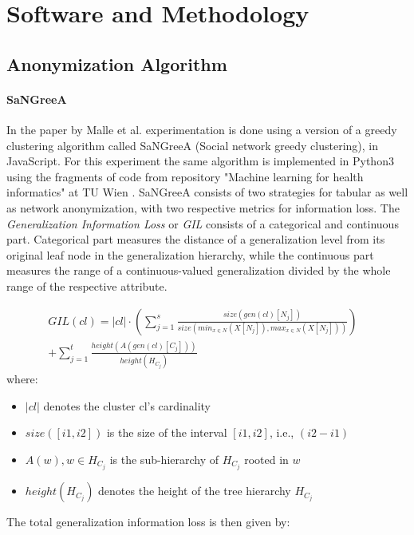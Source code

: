 \documentclass{article}
\begin{document}
\section{Software and Methodology}

\subsection{Anonymization Algorithm}
\paragraph{SaNGreeA}
In the paper by Malle et al. \cite{malle2017not} experimentation is done using a version of a greedy clustering algorithm called SaNGreeA (Social network greedy clustering), \cite{campan2009data} in JavaScript. For this experiment the same algorithm is implemented in Python3 \cite{sarcevic2018sangreea} using the fragments of code from repository "Machine learning for health informatics" at TU Wien \cite{malle2016sangreea}. 
SaNGreeA consists of two strategies for tabular as well as network anonymization, with two respective metrics for information loss. The \textit{Generalization Information Loss} or \textit{GIL} consists of a categorical and continuous part. Categorical part measures the distance of a generalization level from its original leaf node in the generalization hierarchy, while the continuous part measures the range of a continuous-valued generalization divided by the whole range of the respective attribute. 

\begin{align*}
	GIL(cl) = |cl| \cdot (\sum_{j=1}^{s}\frac{size(gen(cl)[N_j])}{size(min_{x\in N}(X[N_j]),max_{x\in N}(X[N_j]))})& \\ 
					+ \sum_{j=1}^{t}\frac{height(A(gen(cl)[C_j]))}{height(H_{C_j})}&
\end{align*}
where:

\begin{itemize}
	\item $|cl|$ denotes the cluster cl's cardinality
	\item $size([i1,i2])$ is the size of the interval $[i1,i2]$, i.e., $(i2-i1)$
	\item $A(w), w\in H_{C_j}$ is the sub-hierarchy of $H_{C_j}$ rooted in $w$
	\item $height(H_{C_j})$ denotes the height of the tree hierarchy $H_{C_j}$
\end{itemize}

The total generalization information loss is then given by:
\end{document}
